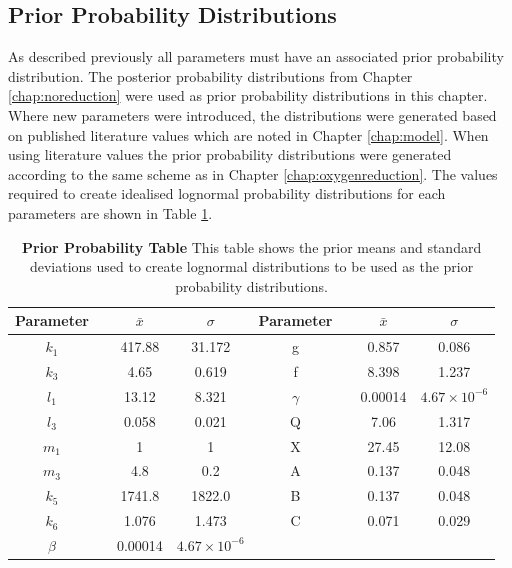 \subsection{Prior Probability Distributions}

As described previously all parameters must have an associated prior probability distribution. The posterior probability distributions from Chapter \ref{chap:noreduction} were used as prior probability distributions in this chapter. Where new parameters were introduced, the distributions were generated based on published literature values which are noted in Chapter \ref{chap:model}. When using literature values the prior probability distributions were generated according to the same scheme as in Chapter \ref{chap:oxygenreduction}. The values required to create idealised lognormal probability distributions for each parameters are shown in Table \ref{tab:nitrite_prior_table}.

\begin{table}[ht]%
\renewcommand{\arraystretch}{1.5}
\begin{center}
\begin{tabular}{cccc|cccc}
\toprule
\textbf{Parameter} && ${\bar{x}}$ & $\sigma$ & \textbf{Parameter} && ${\bar{x}}$ & $\sigma$\\
\midrule
$k_1$ && 417.88 & 31.172 & g && 0.857 & 0.086\\
$k_3$ && 4.65 & 0.619 & f && 8.398 & 1.237\\
$l_1$ && 13.12 & 8.321 & $\gamma$ && 0.00014 & $4.67\times 10^{-6}$\\
$l_3$ && 0.058 & 0.021 & Q && 7.06 & 1.317\\
$m_1$ && 1 & 1 & X && 27.45 & 12.08\\
$m_3$ && 4.8 & 0.2 & A && 0.137 & 0.048\\
$k_5$ && 1741.8 & 1822.0 & B && 0.137 & 0.048\\
$k_6$ && 1.076 & 1.473 & C && 0.071 & 0.029\\
$\beta$ && 0.00014 & $4.67\times 10^{-6}$\\
\bottomrule
\end{tabular}
\end{center}
\caption[Prior Probability Table]{{\bf Prior Probability Table} This table shows the prior means and standard deviations used to create lognormal distributions to be used as the prior probability distributions.
\label{tab:nitrite_prior_table}}
\end{table}

